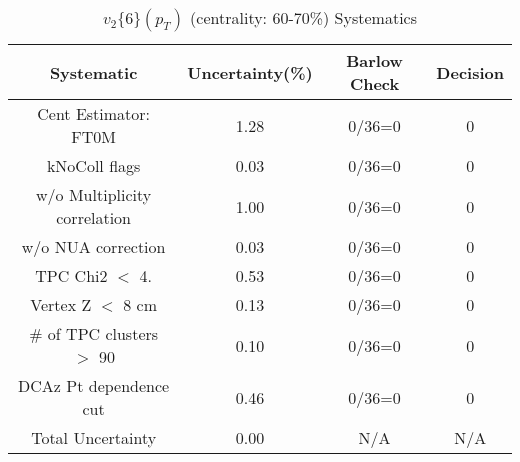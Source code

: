 \begin{table}[htbp]
\caption{$v_2\{6\}(p_{T})$ (centrality: 60-70\%) Systematics}
\label{tab:Sys_pTDiffv26ChFull}
\centering
\begin{tabular}{|c|c|c|c|}
\hline
Systematic & Uncertainty(\%) & Barlow Check & Decision \\
\hline
Cent Estimator: FT0M & 1.28 & 0/36=0 & 0 \\
kNoColl flags & 0.03 & 0/36=0 & 0 \\
w/o Multiplicity correlation & 1.00 & 0/36=0 & 0 \\
w/o NUA correction & 0.03 & 0/36=0 & 0 \\
TPC Chi2 $<$ 4. & 0.53 & 0/36=0 & 0 \\
Vertex Z $<$ 8 cm & 0.13 & 0/36=0 & 0 \\
\# of TPC clusters $>$ 90 & 0.10 & 0/36=0 & 0 \\
DCAz Pt dependence cut & 0.46 & 0/36=0 & 0 \\
\hline
Total Uncertainty & 0.00 & N/A & N/A \\
\hline
\end{tabular}
\end{table}

